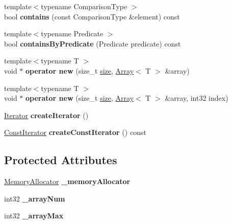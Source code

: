 \begin{DoxyCompactItemize}
{\footnotesize template$<$typename Comparison\+Type $>$ }\\bool {\bfseries contains} (const Comparison\+Type \&element) const
\item 
\mbox{\label{class_arcana_1_1_array_a800f746edb8f36f07fc0c41638d9db45}} 
{\footnotesize template$<$typename Predicate $>$ }\\bool {\bfseries contains\+By\+Predicate} (Predicate predicate) const
\item 
\mbox{\label{class_arcana_1_1_array_a964d40b16b58d3969b00b1f1ce694ccf}} 
{\footnotesize template$<$typename T $>$ }\\void $\ast$ {\bfseries operator new} (size\+\_\+t \mbox{\hyperlink{class_arcana_1_1_array_a546fb9ca70679870ad1989969226c36f}{size}}, \mbox{\hyperlink{class_arcana_1_1_array}{Array}}$<$ T $>$ \&array)
\item 
\mbox{\label{class_arcana_1_1_array_a94ccd11a187090ad289d7503306189dc}} 
{\footnotesize template$<$typename T $>$ }\\void $\ast$ {\bfseries operator new} (size\+\_\+t \mbox{\hyperlink{class_arcana_1_1_array_a546fb9ca70679870ad1989969226c36f}{size}}, \mbox{\hyperlink{class_arcana_1_1_array}{Array}}$<$ T $>$ \&array, int32 index)
\item 
\mbox{\label{class_arcana_1_1_array_a2290741e70f2b13e83691ca97ec18208}} 
\mbox{\hyperlink{class_arcana_1_1_indexed_container_iterator}{Iterator}} {\bfseries create\+Iterator} ()
\item 
\mbox{\label{class_arcana_1_1_array_a91bcbe82e6d145c5eb1573ce8d3f1573}} 
\mbox{\hyperlink{class_arcana_1_1_indexed_container_iterator}{Const\+Iterator}} {\bfseries create\+Const\+Iterator} () const
\end{DoxyCompactItemize}
\subsection*{Protected Attributes}
\begin{DoxyCompactItemize}
\item 
\mbox{\label{class_arcana_1_1_array_ad3fd338f18e1883577d67db6cb3ad940}} 
\mbox{\hyperlink{class_arcana_1_1_memory_allocator}{Memory\+Allocator}} {\bfseries \+\_\+memory\+Allocator}
\item 
\mbox{\label{class_arcana_1_1_array_a8698ceab34bd5f5acef2514448c4d5ec}} 
int32 {\bfseries \+\_\+array\+Num}
\item 
\mbox{\label{class_arcana_1_1_array_a8082d504794dbf5eacfe2dfee7cb72ee}} 
int32 {\bfseries \+\_\+array\+Max}
\end{DoxyCompactItemize}


